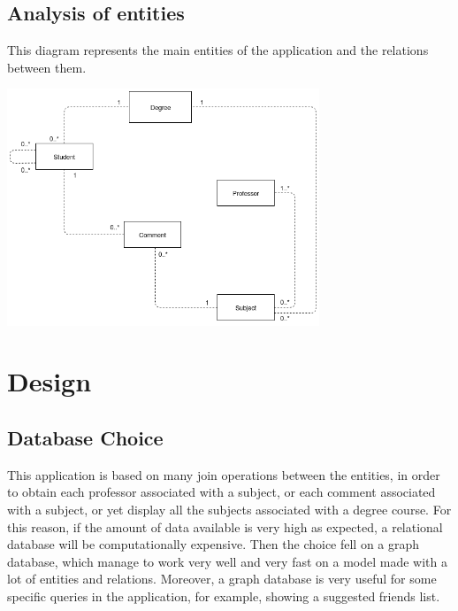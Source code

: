 \documentclass[a4paper]{article}
\begin{document}
\subsection{Analysis of entities}
This diagram represents the main entities of the application and the relations between them.
\begin{minipage}{\linewidth}
\begin{center}
\vspace{4mm}
\includegraphics[width = 0.7\textwidth]{./images/diagrams/AnalysisUML.png} 
\vspace{2mm}
\label{fig:analisys_diagram}
\end{center}
\end{minipage}

\clearpage
\section{Design}

\subsection{Database Choice}
This application is based on many join operations between the entities, in order to obtain each professor associated with a subject, or each comment associated with a subject, or yet display all the subjects associated with a degree course. For this reason, if the amount of data available is very high as expected, a relational database will be computationally expensive. Then the choice fell on a graph database, which manage to work very well and very fast on a model made with a lot of entities and relations. Moreover, a graph database is very useful for some specific queries in the application, for example, showing a suggested friends list. \\
\end{document}
